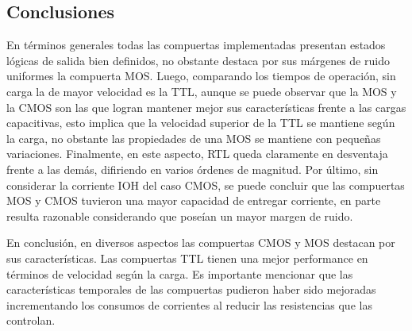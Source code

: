 \subsection{Conclusiones}
En t\'erminos generales todas las compuertas implementadas presentan estados l\'ogicas de salida bien definidos, no obstante destaca por sus m\'argenes de ruido uniformes la compuerta MOS.
Luego, comparando los tiempos de operaci\'on, sin carga la de mayor velocidad es la TTL, aunque se puede observar que la MOS y la CMOS son las que logran mantener mejor sus caracter\'isticas
frente a las cargas capacitivas, esto implica que la velocidad superior de la TTL se mantiene seg\'un la carga, no obstante las propiedades de una MOS se mantiene con peque\~nas variaciones. Finalmente, en este aspecto,
RTL queda claramente en desventaja frente a las dem\'as, difiriendo en varios \'ordenes de magnitud.
Por \'ultimo, sin considerar la corriente IOH del caso CMOS, se puede concluir que las compuertas MOS y CMOS tuvieron una mayor capacidad de entregar corriente,
en parte resulta razonable considerando que pose\'ian un mayor margen de ruido.

En conclusi\'on, en diversos aspectos las compuertas CMOS y MOS destacan por sus caracter\'isticas. Las compuertas TTL tienen una mejor performance en t\'erminos de velocidad seg\'un la carga.
Es importante mencionar que las caracter\'isticas temporales de las compuertas pudieron haber sido mejoradas incrementando los consumos de corrientes al reducir las resistencias que las controlan.